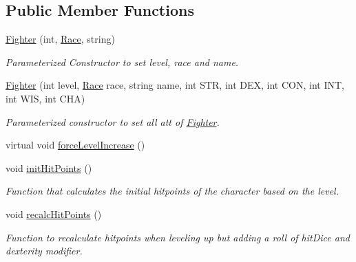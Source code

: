 \subsection*{Public Member Functions}
\begin{DoxyCompactItemize}
\item 
\hypertarget{class_fighter_ad1fcbd2f4c389221611e379f3df46ca8}{}\label{class_fighter_ad1fcbd2f4c389221611e379f3df46ca8} 
\hyperlink{class_fighter_ad1fcbd2f4c389221611e379f3df46ca8}{Fighter} (int, \hyperlink{_entity_8h_aa2df4028f474807638d438104900b003}{Race}, string)
\begin{DoxyCompactList}\small\item\em Parameterized Constructor to set level, race and name. \end{DoxyCompactList}\item 
\hypertarget{class_fighter_a601ebcca9ea2287c54a0995dc11a117c}{}\label{class_fighter_a601ebcca9ea2287c54a0995dc11a117c} 
\hyperlink{class_fighter_a601ebcca9ea2287c54a0995dc11a117c}{Fighter} (int level, \hyperlink{_entity_8h_aa2df4028f474807638d438104900b003}{Race} race, string name, int S\+TR, int D\+EX, int C\+ON, int I\+NT, int W\+IS, int C\+HA)
\begin{DoxyCompactList}\small\item\em Parameterized constructor to set all att of \hyperlink{class_fighter}{Fighter}. \end{DoxyCompactList}\item 
virtual void \hyperlink{class_fighter_a774a40f8466eec10bee12b02e43e0aad}{force\+Level\+Increase} ()
\item 
\hypertarget{class_fighter_a5bfd7630b47d4bf3b7b1288195bbad07}{}\label{class_fighter_a5bfd7630b47d4bf3b7b1288195bbad07} 
void \hyperlink{class_fighter_a5bfd7630b47d4bf3b7b1288195bbad07}{init\+Hit\+Points} ()
\begin{DoxyCompactList}\small\item\em Function that calculates the initial hitpoints of the character based on the level. \end{DoxyCompactList}\item 
\hypertarget{class_fighter_a82d21934022da1ffe16396e5fb407897}{}\label{class_fighter_a82d21934022da1ffe16396e5fb407897} 
void \hyperlink{class_fighter_a82d21934022da1ffe16396e5fb407897}{recalc\+Hit\+Points} ()
\begin{DoxyCompactList}\small\item\em Function to recalculate hitpoints when leveling up but adding a roll of hit\+Dice and dexterity modifier. \end{DoxyCompactList}\item 

\end{DoxyCompactItemize}
